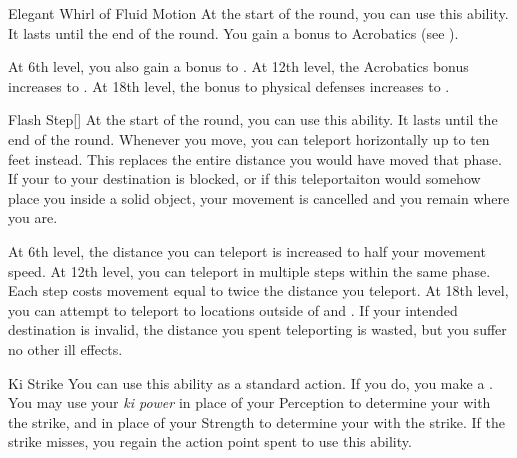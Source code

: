 {            \begin{ability}{Elegant Whirl of Fluid Motion}
                At the start of the round, you can use this ability.
                It lasts until the end of the round.
                You gain a  bonus to Acrobatics (see ).

                At 6th level, you also gain a  bonus to .
                At 12th level, the Acrobatics bonus increases to .
                At 18th level, the bonus to physical defenses increases to .
            \end{ability}

            \begin{ability}{Flash Step}[]
                At the start of the round, you can use this ability.
                It lasts until the end of the round.
                Whenever you move, you can teleport horizontally up to ten feet instead.
                This replaces the entire distance you would have moved that phase.
                If your  to your destination is blocked, or if this teleportaiton would somehow place you inside a solid object, your movement is cancelled and you remain where you are.

                At 6th level, the distance you can teleport is increased to half your movement speed.
                At 12th level, you can teleport in multiple steps within the same phase.
                Each step costs movement equal to twice the distance you teleport.
                At 18th level, you can attempt to teleport to locations outside of  and .
                If your intended destination is invalid, the distance you spent teleporting is wasted, but you suffer no other ill effects.
            \end{ability}

            \begin{ability}{Ki Strike}
                You can use this ability as a standard action.
                If you do, you make a .
                You may use your \textit{ki power} in place of your Perception to determine your  with the strike, and in place of your Strength to determine your  with the strike.
                If the strike misses, you regain the action point spent to use this ability.


\end{ability}}
